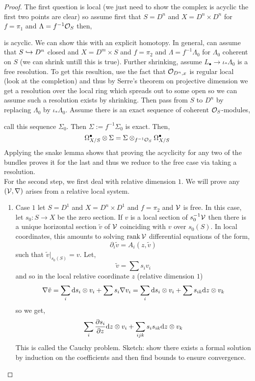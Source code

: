 \documentclass[12pt]{article}
\begin{document}
\begin{proof}
The first question is local (we just need to show the complex is acyclic the first two points are clear) so assume first that $S = D^n$ and $X = D^n \times D^n$ for $f = \pi_1$ and $\Lambda = f^{-1} \mathcal{O}_{S}$ then,
\begin{center}
\end{center}
is acyclic. We can show this with an explicit homotopy. In general, can assume that $S \hookrightarrow D^n$ closed and $X = D^m \times S$ and $f = \pi_2$ and $\Lambda = f^{-1} \Lambda_0$ for $\Lambda_0$ coherent on $S$ (we can shrink untill this is true). Further shrinking, assume $L_\bullet \to \iota_* \Lambda_0$ is a free resolution. To get this resultion, use the fact that $\mathcal{O}_{D^n, x}$ is regular local (look at the completion) and thus by Serre's theorem on projective dimension we get a resolution over the local ring which spreads out to some open so we can assume such a resolution exists by shrinking. Then pass from $S$ to $D^n$ by replacing $\Lambda_0$ by $\iota_* \Lambda_0$. Assume there is an exact sequence of coherent $\mathcal{O}_{S}$-modules,
\begin{center}
\end{center}
call this sequence $\Sigma_0$. Then $\Sigma := f^{-1} \Sigma_0$ is exact. Then,
\[ \Omega_{X/S}^\bullet \otimes \Sigma = \Sigma \otimes_{f^{-1} \mathcal{O}_{S}} \Omega^\bullet_{X/S} \]
Applying the snake lemma shows that proving the acyclicity for any two of the bundles proves it for the last and thus we reduce to the free case via taking a resolution. 
\bigskip\\
For the second step, we first deal with relative dimension $1$. We will prove any $(\mathcal{V}, \nabla)$ arises from a relative local system. 
\begin{enumerate}
\item Case $1$ let $S = D^1$ and $X = D^{n} \times D^1$ and $f = \pi_2$ and $\mathcal{V}$ is free. In this case, let $s_0 : S \to X$ be the zero section. If $v$ is a local section of $s_0^{-1} \mathcal{V}$ then there is a unique horizontal section $\tilde{v}$ of $\mathcal{V}$ coinciding with $v$ over $s_0(S)$. In local coordinates, this amounts to solving $\operatorname{\mathrm{rank}} \mathcal{V}$ differential equations of the form,
\[ \partial_i \tilde{v} = A_i(z, \tilde{v}) \]
such that $\tilde{v} |_{s_0(S)} = v$. 
Let,
\[ \tilde{v} = \sum s_i v_i \]
and so in the local relative coordinate $z$ (relative dimension $1$)
\[ \nabla \tilde{v} = \sum_i \mathrm{d}{s_i} \otimes v_i + \sum s_i \nabla v_i = \sum_i \mathrm{d}{s_i} \otimes v_i + \sum s_{ik} \mathrm{d}{z} \otimes v_k  \]
so we get,
\[ \sum_{i} \frac{\partial{s_i}}{\partial{z}} \mathrm{d}{z} \otimes v_i + \sum_{ijk} s_i s_{ik} \mathrm{d}{z} \otimes v_k \]
This is called the Cauchy problem. Sketch: show there exists a formal solution by induction on the coefficients and then find bounds to ensure convergence. 


\end{enumerate}
\end{proof}
\end{document}
